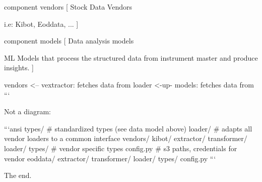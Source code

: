 \documentclass{article}
\begin{document}
component vendors [
Stock Data Vendors

i.e: Kibot, Eoddata, ...
]

component models [
Data analysis models

ML Models that process the structured data from instrument
master and produce insights.
]

vendors <-- vextractor: fetches data from
loader <-up- models: fetches data from
```

Not a diagram:

```ansi
types/  # standardized types (see data model above)
loader/  # adapts all vendor loaders to a common interface
vendors/
   kibot/
      extractor/
      transformer/
      loader/
      types/  # vendor specific types
      config.py  # s3 paths, credentials for vendor
   eoddata/
      extractor/
      transformer/
      loader/
      types/
      config.py
```

The end.
\end{document}
